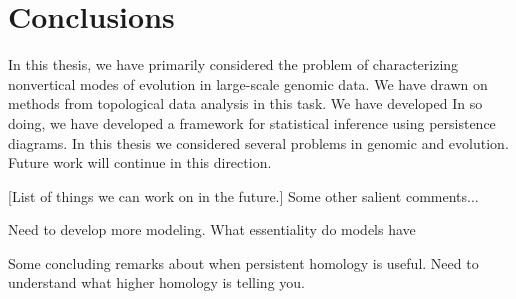 
\chapter{Conclusions}
\label{ch:conclusions}

In this thesis, we have primarily considered the problem of characterizing nonvertical modes of evolution in large-scale genomic data.
We have drawn on methods from topological data analysis in this task.
We have developed 
In so doing, we have developed a framework for statistical inference using persistence diagrams.
In this thesis we considered several problems in genomic and evolution.
Future work will continue in this direction.

[List of things we can work on in the future.]
Some other salient comments...

Need to develop more modeling.
What essentiality do models have

Some concluding remarks about when persistent homology is useful.
Need to understand what higher homology is telling you.
